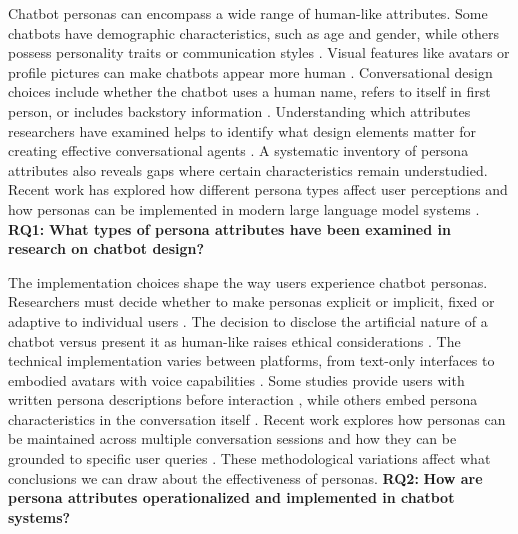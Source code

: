 \documentclass{article}
\begin{document}
Chatbot personas can encompass a wide range of human-like attributes. Some chatbots have demographic characteristics, such as age and gender, while others possess personality traits or communication styles \citep{go2019humanizing}. Visual features like avatars or profile pictures can make chatbots appear more human \citep{araujo2018living}. Conversational design choices include whether the chatbot uses a human name, refers to itself in first person, or includes backstory information \citep{seeger2021texting}. Understanding which attributes researchers have examined helps to identify what design elements matter for creating effective conversational agents \citep{blut2021understanding}. A systematic inventory of persona attributes also reveals gaps where certain characteristics remain understudied. Recent work has explored how different persona types affect user perceptions \citep{sun2024building} and how personas can be implemented in modern large language model systems \citep{chen2024trends}. \textbf{RQ1:} \textbf{What types of persona attributes have been examined in research on chatbot design?}

The implementation choices shape the way users experience chatbot personas. Researchers must decide whether to make personas explicit or implicit, fixed or adaptive to individual users \citep{huang2023personalized}. The decision to disclose the artificial nature of a chatbot versus present it as human-like raises ethical considerations \citep{araujo2018living}. The technical implementation varies between platforms, from text-only interfaces to embodied avatars with voice capabilities \citep{go2019humanizing}. Some studies provide users with written persona descriptions before interaction \citep{zhang2018personalizing,dinan2020second}, while others embed persona characteristics in the conversation itself \citep{song2021bob}. Recent work explores how personas can be maintained across multiple conversation sessions \citep{xu2022beyond} and how they can be grounded to specific user queries \citep{jang2022focus}. These methodological variations affect what conclusions we can draw about the effectiveness of personas. \textbf{RQ2:} \textbf{How are persona attributes operationalized and implemented in chatbot systems?}
\end{document}
